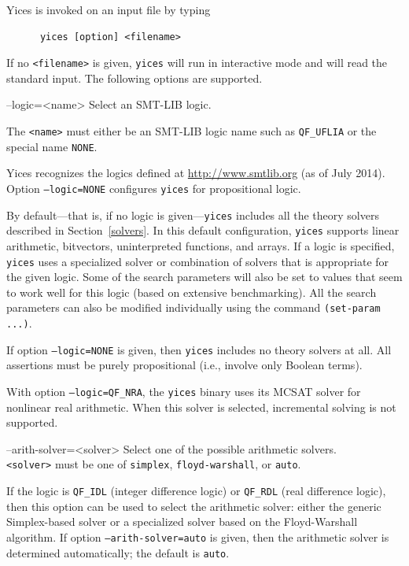 \documentclass[11pt,twoside,fleqn,openright,titlepage]{cslreport}
\newenvironment{options}{
\begin{list}{}{
\setlength{\labelsep}{1.8ex}
\setlength{\labelwidth}{0pt}
\setlength{\itemindent}{-0.5\leftmargin}
\settowidth{\leftmargin}{\texttt{--}}
\renewcommand{\makelabel}{\optionlabel}}}
{\end{list}}
\newcommand*\optionlabel[1]{\hspace\labelsep\texttt{#1}}
\begin{document}
Yices is invoked on an input file by typing
\begin{verbatim}
      yices [option] <filename>
\end{verbatim}
If no \texttt{<filename>} is given, \texttt{yices} will run in
interactive mode and will read the standard input. The following
options are supported.
\begin{options}
\item[--logic=<name>] Select an SMT-LIB logic.

  The \texttt{<name>} must either be an SMT-LIB logic name such as
  \texttt{QF\_UFLIA} or the special name \texttt{NONE}.

  Yices recognizes the logics defined at \url{http://www.smtlib.org}
  (as of July 2014).  Option \texttt{--logic=NONE} configures
  \texttt{yices} for propositional logic.

  By default---that is, if no logic is given---\texttt{yices} includes
  all the  theory solvers described in  Section~\ref{solvers}. In this
  default  configuration, \texttt{yices}  supports  linear arithmetic,
  bitvectors,  uninterpreted  functions, and  arrays.  If  a logic  is
  specified, \texttt{yices}  uses a specialized  solver or combination
  of  solvers that is  appropriate for  the given  logic. Some  of the
  search parameters will also be set  to values that seem to work well
  for  this logic (based  on extensive  benchmarking). All  the search
  parameters  can  also be  modified  individually  using the  command
  \texttt{(set-param ...)}.

  If  option  \texttt{--logic=NONE}   is  given,  then  \texttt{yices}
  includes no  theory solvers  at all. All  assertions must  be purely
  propositional (i.e., involve only Boolean terms).

  With option \texttt{--logic=QF\_NRA}, the \texttt{yices} binary uses
  its MCSAT solver for nonlinear real arithmetic. When this solver is
  selected, incremental solving is not supported.

\item[--arith-solver=<solver>] Select one of the possible arithmetic solvers.\\[1mm]
  \texttt{<solver>}     must    be     one     of    \texttt{simplex},
  \texttt{floyd-warshall}, or \texttt{auto}.

  If  the  logic is  \texttt{QF\_IDL}  (integer  difference logic)  or
  \texttt{QF\_RDL} (real  difference logic),  then this option  can be
  used   to  select   the  arithmetic   solver:  either   the  generic
  Simplex-based  solver   or  a   specialized  solver  based   on  the
  Floyd-Warshall algorithm.  If option \texttt{--arith-solver=auto} is
  given, then  the arithmetic solver is  determined automatically; the
  default is \texttt{auto}.


\end{options}
\end{document}
